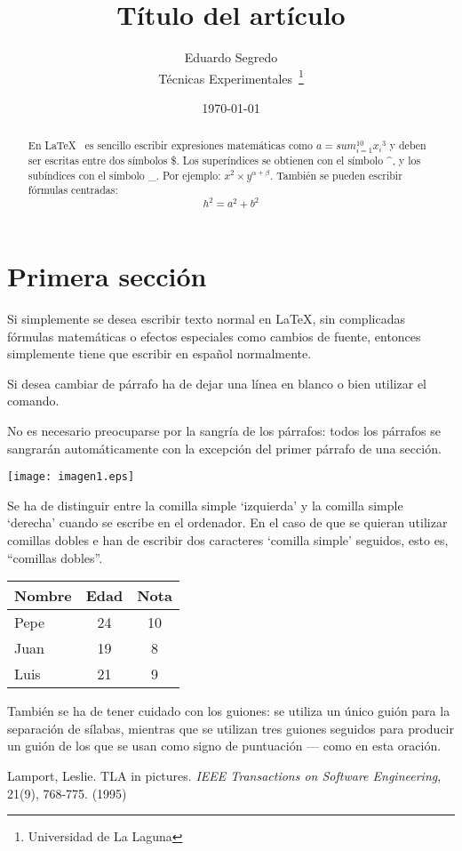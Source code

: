 \documentclass[a4paper,12pt]{article}
\begin{document}
\title{Título del artículo}
\author{Eduardo Segredo \\
        Técnicas Experimentales~\footnote{Universidad de La Laguna}
       }
\date{\today}
\maketitle
\begin{abstract}
En \LaTeX{}~\cite{Lam:86} es sencillo escribir expresiones
matemáticas como $a=sum_{i=1}^{10} {x_i}^{3}$
y deben ser escritas entre dos símbolos \$.
Los superíndices se obtienen con el símbolo \^{}, y
los subíndices con el símbolo \_.
Por ejemplo: $x^2 \times y^{\alpha + \beta}$.
También se pueden escribir fórmulas centradas:
\[h^2 = a^2 + b^2\]
\end{abstract}

\section{Primera sección}
Si simplemente se desea escribir texto normal en LaTeX,
sin complicadas f\'ormulas matem\'aticas o efectos especiales
como cambios de fuente, entonces simplemente tiene que escribir
en espa\~nol normalmente. \par
Si desea cambiar de párrafo ha de dejar una línea en blanco o bien
utilizar el comando.

No es necesario preocuparse por la sangría de los párrafos:
todos los párrafos se sangrarán automáticamente con la excepción
del primer párrafo de una sección.

\texttt{[image: imagen1.eps]}

Se ha de distinguir entre la comilla simple `izquierda' 
y la comilla simple `derecha' cuando se escribe en el ordenador.
En el caso de que se quieran utilizar comillas dobles e han de
escribir dos caracteres `comilla simple' seguidos, esto es,
``comillas dobles''.



\bigskip
\begin{tabular}{|l|c|c|}
\hline
  Nombre & Edad & Nota \\ \hline
  Pepe   &   24 &   10 \\ \hline
  Juan   &   19 &    8 \\ \hline
  Luis   &   21 &    9 \\ \hline
\end{tabular}

También se ha de tener cuidado con los guiones: se utiliza un único
guión para la separación de sílabas, mientras que se utilizan
tres guiones seguidos para producir un guión de los que se usan
como signo de puntuación --- como en esta oración.



\begin{thebibliography}{OO}
    Lamport, Leslie.
    TLA in pictures.
    \emph{IEEE Transactions on Software Engineering},
    21(9), 768-775.
    (1995)
\end{thebibliography}
\end{document}
